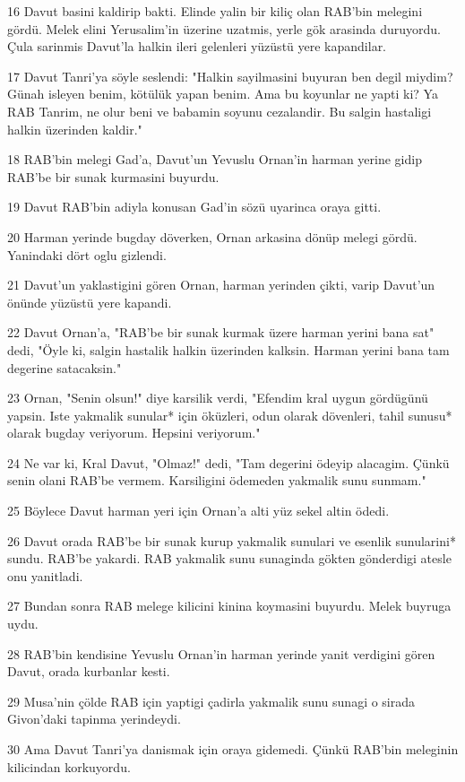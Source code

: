 \par 16 Davut basini kaldirip bakti. Elinde yalin bir kiliç olan RAB'bin melegini gördü. Melek elini Yerusalim'in üzerine uzatmis, yerle gök arasinda duruyordu. Çula sarinmis Davut'la halkin ileri gelenleri yüzüstü yere kapandilar.
\par 17 Davut Tanri'ya söyle seslendi: "Halkin sayilmasini buyuran ben degil miydim? Günah isleyen benim, kötülük yapan benim. Ama bu koyunlar ne yapti ki? Ya RAB Tanrim, ne olur beni ve babamin soyunu cezalandir. Bu salgin hastaligi halkin üzerinden kaldir."
\par 18 RAB'bin melegi Gad'a, Davut'un Yevuslu Ornan'in harman yerine gidip RAB'be bir sunak kurmasini buyurdu.
\par 19 Davut RAB'bin adiyla konusan Gad'in sözü uyarinca oraya gitti.
\par 20 Harman yerinde bugday döverken, Ornan arkasina dönüp melegi gördü. Yanindaki dört oglu gizlendi.
\par 21 Davut'un yaklastigini gören Ornan, harman yerinden çikti, varip Davut'un önünde yüzüstü yere kapandi.
\par 22 Davut Ornan'a, "RAB'be bir sunak kurmak üzere harman yerini bana sat" dedi, "Öyle ki, salgin hastalik halkin üzerinden kalksin. Harman yerini bana tam degerine satacaksin."
\par 23 Ornan, "Senin olsun!" diye karsilik verdi, "Efendim kral uygun gördügünü yapsin. Iste yakmalik sunular* için öküzleri, odun olarak dövenleri, tahil sunusu* olarak bugday veriyorum. Hepsini veriyorum."
\par 24 Ne var ki, Kral Davut, "Olmaz!" dedi, "Tam degerini ödeyip alacagim. Çünkü senin olani RAB'be vermem. Karsiligini ödemeden yakmalik sunu sunmam."
\par 25 Böylece Davut harman yeri için Ornan'a alti yüz sekel altin ödedi.
\par 26 Davut orada RAB'be bir sunak kurup yakmalik sunulari ve esenlik sunularini* sundu. RAB'be yakardi. RAB yakmalik sunu sunaginda gökten gönderdigi atesle onu yanitladi.
\par 27 Bundan sonra RAB melege kilicini kinina koymasini buyurdu. Melek buyruga uydu.
\par 28 RAB'bin kendisine Yevuslu Ornan'in harman yerinde yanit verdigini gören Davut, orada kurbanlar kesti.
\par 29 Musa'nin çölde RAB için yaptigi çadirla yakmalik sunu sunagi o sirada Givon'daki tapinma yerindeydi.
\par 30 Ama Davut Tanri'ya danismak için oraya gidemedi. Çünkü RAB'bin meleginin kilicindan korkuyordu.

